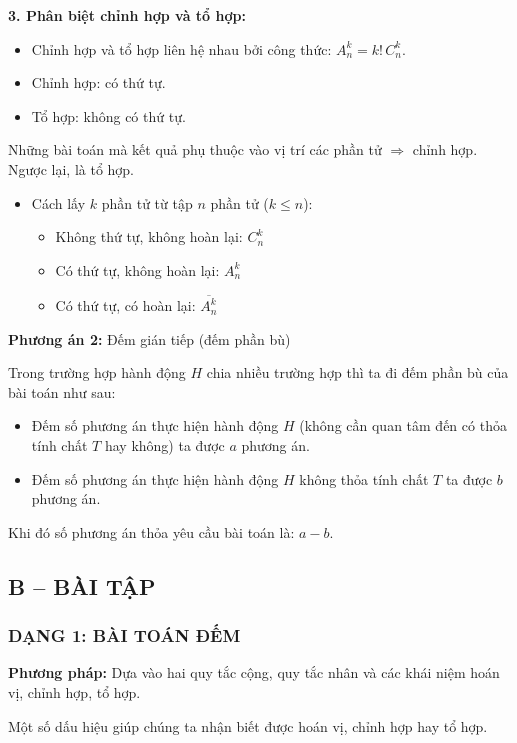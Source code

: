\textbf{3. Phân biệt chỉnh hợp và tổ hợp:}
\begin{itemize}
	\item Chỉnh hợp và tổ hợp liên hệ nhau bởi công thức: $A_n^k=k!\,C_n^k$.
	\item Chỉnh hợp: có thứ tự.
	\item Tổ hợp: không có thứ tự.
\end{itemize}
Những bài toán mà kết quả phụ thuộc vào vị trí các phần tử $\Rightarrow$ chỉnh hợp. Ngược lại, là tổ hợp.
\begin{itemize}
	\item Cách lấy $k$ phần tử từ tập $n$ phần tử ($k\le n$):
	      \begin{itemize}
		      \item[+] Không thứ tự, không hoàn lại: $C_n^k$
		      \item[+] Có thứ tự, không hoàn lại: $A_n^k$
		      \item[+] Có thứ tự, có hoàn lại: $\overline{A_n^k}$
	      \end{itemize}
\end{itemize}

\textbf{Phương án 2:} Đếm gián tiếp (đếm phần bù)

Trong trường hợp hành động $H$ chia nhiều trường hợp thì ta đi đếm phần bù của bài toán như sau:
\begin{itemize}
	\item Đếm số phương án thực hiện hành động $H$ (không cần quan tâm đến có thỏa tính chất $T$ hay không) ta được $a$ phương án.
	\item Đếm số phương án thực hiện hành động $H$ không thỏa tính chất $T$ ta được $b$ phương án.
\end{itemize}
Khi đó số phương án thỏa yêu cầu bài toán là: $a-b$.

\subsection*{B -- BÀI TẬP}

\subsubsection*{DẠNG 1: BÀI TOÁN ĐẾM}

\textbf{Phương pháp:} Dựa vào hai quy tắc cộng, quy tắc nhân và các khái niệm hoán vị, chỉnh hợp, tổ hợp.

Một số dấu hiệu giúp chúng ta nhận biết được hoán vị, chỉnh hợp hay tổ hợp.

